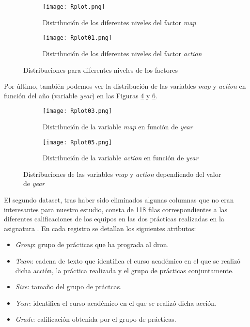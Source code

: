 \documentclass[10pt,a4paper]{article}
\begin{document}
\begin{figure}[!tbp]
  \begin{subfigure}[b]{0.49\textwidth}
    \texttt{[image: Rplot.png]}
    \caption{Distribución de los diferentes niveles del factor \emph{map}}
    \label{fig:yearmap}
  \end{subfigure}
  \hfill
  \begin{subfigure}[b]{0.49\textwidth}
    \texttt{[image: Rplot01.png]}
    \caption{Distribución de los diferentes niveles del factor \emph{action}}
    \label{fig:yearaction}
  \end{subfigure}
  \caption{Distribuciones para diferentes niveles de los factores}
\end{figure}

Por último, también podemos ver la distribución de las variables \emph{map} y \emph{action} en función del año (variable \emph{year}) en las Figuras \ref{fig:mapyear} y \ref{fig:actionyear}.

\begin{figure}[!tbp]
  \begin{subfigure}[b]{0.49\textwidth}
    \texttt{[image: Rplot03.png]}
    \caption{Distribución de la variable \emph{map} en función de \emph{year}}
    \label{fig:mapyear}
  \end{subfigure}
  \hfill
  \begin{subfigure}[b]{0.49\textwidth}
    \texttt{[image: Rplot05.png]}
    \caption{Distribución de la variable \emph{action} en función de \emph{year}}
    \label{fig:actionyear}
  \end{subfigure}
  \caption{Distribuciones de las variables \emph{map} y \emph{action} dependiendo del valor de \emph{year}}
\end{figure}

El segundo dataset, tras haber sido eliminados algunas columnas que no eran interesantes para nuestro estudio, consta de 118 filas correspondientes a las diferentes calificaciones de los equipos en las dos prácticas realizadas en la asignatura \href{https://www.ugr.es/estudiantes/grados/grado-ingenieria-informatica/desarrollo-basado-agentes-ing-software}{\color{blue}{Desarrollo Basado en Agentes}}. En cada registro se detallan los siguientes atributos:
\begin{itemize}
\item \emph{Group}: grupo de prácticas que ha prograda al dron.
\item \emph{Team}: cadena de texto que identifica el curso académico en el que se realizó dicha acción, la práctica realizada y el grupo de prácticas conjuntamente.
\item \emph{Size}: tamaño del grupo de práctcas.
\item \emph{Year}: identifica el curso académico en el que se realizó dicha acción.
\item \emph{Grade}: calificación obtenida por el grupo de prácticas.
\end{itemize}
\end{document}
